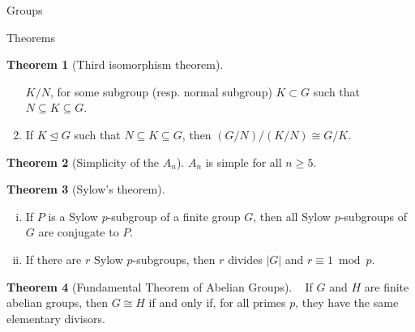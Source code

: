 \documentclass{article}
\theoremstyle{definition}
\newtheorem{theorem}{Theorem}
\numberwithin{theorem}{subsection} %
\theoremstyle{definition}
\begin{document}
\begin{section}{Groups}
\begin{subsection}{Theorems}
\begin{theorem}[Third isomorphism theorem]
\begin{enumerate}
        $K/N$, for some subgroup (resp. normal subgroup) $K \subset G$ such that
        $N \subseteq K \subseteq G$.
        \item If $K \trianglelefteq G$ such that $N \subseteq K \subseteq G$,
        then $(G/N)/(K/N) \cong G/K$.
      \end{enumerate}
    \end{theorem}
    \begin{theorem}[Simplicity of the $A_n$] %
      $A_n$ is simple for all $n \geq 5$.
    \end{theorem}
    \begin{theorem}[Sylow's theorem] ~ %
      \begin{enumerate}[(i)]
        \item If $P$ is a Sylow $p$-subgroup of a finite group $G$, then all
        Sylow $p$-subgroups of $G$ are conjugate to $P$.
        \item If there are $r$ Sylow $p$-subgroups, then $r$ divides $|G|$ and
        $r \equiv 1 \bmod p$.
      \end{enumerate}
    \end{theorem}
    \begin{theorem}[Fundamental Theorem of Abelian Groups] ~ %
      If $G$ and $H$ are finite abelian groups, then $G \cong H$ if and only if,
      for all primes $p$, they have the same elementary divisors.
    \end{theorem}
  \end{subsection}
\end{section}
\end{document}

